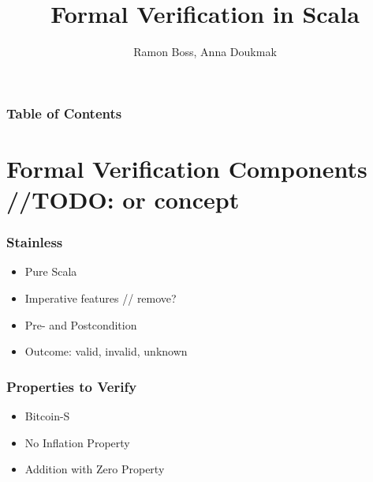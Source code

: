 \documentclass{beamer}
\begin{document}
\title{Formal Verification in Scala}
\author{Ramon Boss, Anna Doukmak}

\frame{\titlepage}

\begin{frame}
  \frametitle{Table of Contents}
  \tableofcontents
\end{frame}

\section{Formal Verification Components //TODO: or concept}

\begin{frame}
\frametitle{Stainless}
  \begin{itemize}
    \item Pure Scala
    \item Imperative features // remove?
    \item Pre- and Postcondition
    \item Outcome: valid, invalid, unknown
  \end{itemize}
\end{frame}


\begin{frame}
\frametitle{Properties to Verify}
\begin{itemize}
  \item Bitcoin-S
  \item No Inflation Property
  \item Addition with Zero Property
\end{itemize}

\end{frame}
\end{document}
